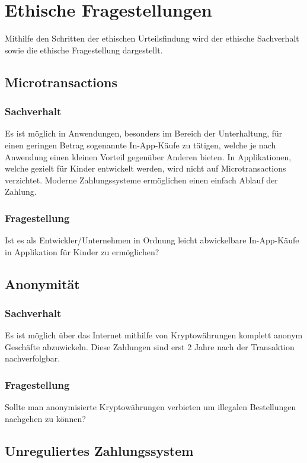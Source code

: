 \section{Ethische Fragestellungen}
Mithilfe den Schritten der ethischen Urteilsfindung wird der ethische Sachverhalt sowie die ethische Fragestellung dargestellt.

\subsection{Microtransactions}
\subsubsection{Sachverhalt}
Es ist möglich in Anwendungen, besonders im Bereich der Unterhaltung, für einen geringen Betrag sogenannte In-App-Käufe zu tätigen, welche je nach Anwendung einen kleinen Vorteil gegenüber Anderen bieten. In Applikationen, welche gezielt für Kinder entwickelt werden, wird nicht auf Microtransactions verzichtet. Moderne Zahlungssysteme ermöglichen einen einfach Ablauf der Zahlung.

\subsubsection{Fragestellung}
Ist es als Entwickler/Unternehmen in Ordnung leicht abwickelbare In-App-Käufe in Applikation für Kinder zu ermöglichen?

\subsection{Anonymität}
\subsubsection{Sachverhalt}
Es ist möglich über das Internet mithilfe von Kryptowährungen komplett anonym Geschäfte abzuwickeln. Diese Zahlungen sind erst 2 Jahre nach der Transaktion nachverfolgbar. 

\subsubsection{Fragestellung}
Sollte man anonymisierte Kryptowährungen verbieten um illegalen Bestellungen nachgehen zu können?

\subsection{Unreguliertes Zahlungssystem}
